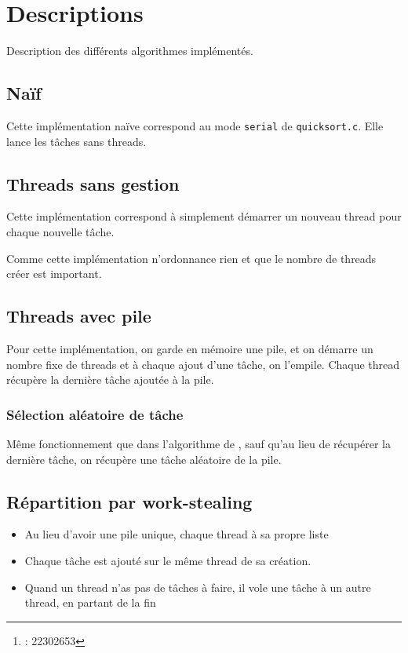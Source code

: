 \documentclass{article}
\title{\docTitle}
\author{\href{\authorMail}{\anri}\thanks{\anri : 22302653}}
\date{Année universitaire 2023-2024}
\newcommand{\docref}[1]{\textit{\nameref{#1}}} %
\begin{document}
\maketitle
\flushbottom
\tableofcontents
\clearpage


\section{Descriptions}
Description des différents algorithmes implémentés.

\subsection{Naïf}
Cette implémentation naïve correspond au mode \texttt{serial}
de \texttt{quicksort.c}. Elle lance les tâches sans threads.

\subsection[Threads sans gestion]{Threads sans gestion}
Cette implémentation correspond à simplement démarrer un nouveau thread
pour chaque nouvelle tâche.

Comme cette implémentation n'ordonnance rien et que le nombre de threads créer
est important.

\subsection{Threads avec pile}\label{desc:th_pile}
Pour cette implémentation, on garde en mémoire une pile,
et on démarre un nombre fixe de threads et à chaque ajout d'une tâche,
on l'empile. Chaque thread récupère la dernière tâche ajoutée à la pile.

\subsubsection{Sélection aléatoire de tâche}
Même fonctionnement que dans l'algorithme de \docref{desc:th_pile}, sauf
qu'au lieu de récupérer la dernière tâche, on récupère une tâche
aléatoire de la pile.

\subsection{Répartition par work-stealing}
\begin{itemize}
      \item Au lieu d'avoir une pile unique, chaque thread à sa propre liste
      \item Chaque tâche est ajouté sur le même thread de sa création.
      \item Quand un thread n'as pas de tâches à faire, il vole une tâche à un autre
            thread, en partant de la fin
\end{itemize}
\end{document}

